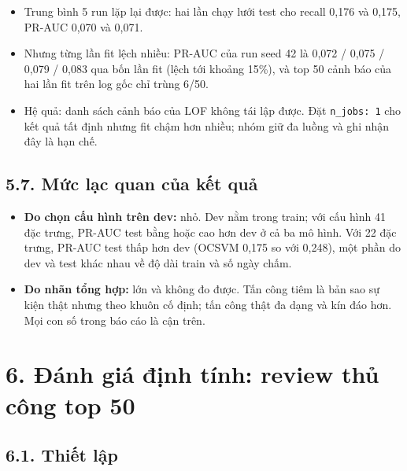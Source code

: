 \documentclass[
  11pt,
]{article}
\providecommand{\tightlist}{%
  \setlength{\itemsep}{0pt}\setlength{\parskip}{0pt}}
\begin{document}
\begin{itemize}
\tightlist
\item
  Trung bình 5 run lặp lại được: hai lần chạy lưới test cho recall 0,176
  và 0,175, PR-AUC 0,070 và 0,071.
\item
  Nhưng từng lần fit lệch nhiều: PR-AUC của run seed 42 là 0,072 / 0,075
  / 0,079 / 0,083 qua bốn lần fit (lệch tới khoảng 15\%), và top 50 cảnh
  báo của hai lần fit trên log gốc chỉ trùng 6/50.
\item
  Hệ quả: danh sách cảnh báo của LOF không tái lập được. Đặt
  \texttt{n\_\allowbreak{}jobs: 1} cho kết quả tất định nhưng fit chậm
  hơn nhiều; nhóm giữ đa luồng và ghi nhận đây là hạn chế.
\end{itemize}

\hypertarget{mux1ee9c-lux1ea1c-quan-cux1ee7a-kux1ebft-quux1ea3}{%
\subsection{5.7. Mức lạc quan của kết
quả}\label{mux1ee9c-lux1ea1c-quan-cux1ee7a-kux1ebft-quux1ea3}}

\begin{itemize}
\tightlist
\item
  \textbf{Do chọn cấu hình trên dev:} nhỏ. Dev nằm trong train; với cấu
  hình 41 đặc trưng, PR-AUC test bằng hoặc cao hơn dev ở cả ba mô hình.
  Với 22 đặc trưng, PR-AUC test thấp hơn dev (OCSVM 0,175 so với 0,248),
  một phần do dev và test khác nhau về độ dài train và số ngày chấm.
\item
  \textbf{Do nhãn tổng hợp:} lớn và không đo được. Tấn công tiêm là bản
  sao sự kiện thật nhưng theo khuôn cố định; tấn công thật đa dạng và
  kín đáo hơn. Mọi con số trong báo cáo là cận trên.
\end{itemize}

\hypertarget{ux111uxe1nh-giuxe1-ux111ux1ecbnh-tuxednh-review-thux1ee7-cuxf4ng-top-50}{%
\section{6. Đánh giá định tính: review thủ công top
50}\label{ux111uxe1nh-giuxe1-ux111ux1ecbnh-tuxednh-review-thux1ee7-cuxf4ng-top-50}}

\hypertarget{thiux1ebft-lux1eadp}{%
\subsection{6.1. Thiết lập}\label{thiux1ebft-lux1eadp}}
\end{document}
